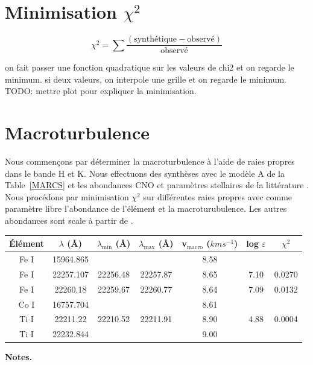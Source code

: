 \documentclass{article}
\begin{document}
\section{\sc Minimisation \texorpdfstring{$\chi^2$}{chi-squared}}

$$\chi^2 = \sum \frac{(\text{synth\'etique}-\text{observ\'e})}{\text{observ\'e}}$$

on fait passer une fonction quadratique sur les valeurs de chi2 et on regarde le minimum.
si deux valeurs, on interpole une grille et on regarde le minimum.
TODO: mettre plot pour expliquer la minimisation. 

\section{Macroturbulence}
Nous commençons par déterminer la macroturbulence à l'aide de raies propres dans le bande H et K. Nous effectuons des synthèses avec le modèle A de la Table~\ref{MARCS} et les abondances CNO et paramètres stellaires de la littérature \cite{shetye_s_2018}. Nous procédons par minimisation $\chi^2$ sur différentes raies propres avec comme paramètre libre l'abondance de l'élément et la macroturubulence. 
Les autres abondances sont scale à partir de \cite{grevesse_solar_2007}.

\begin{table}[h!]
\vspace{0.3cm}

\begin{center}
	\begin{tabular}{ccccccc}
        \hline
		\hline
        Élément & $\lambda$ (Å) & $\lambda_{\mathrm{min}}$ (Å) & $\lambda_{\mathrm{max}}$ (Å)& v$_{\mathrm{macro}}$ ($km s^{-1}$) & log $\varepsilon$ & $\chi^2$\\
        \hline
    Fe I & 15964.865 &&& 8.58 && \\
    Fe I & 22257.107 &22256.48&22257.87& 8.65 &7.10& 0.0270\\
    Fe I & 22260.18 &22259.67&22260.77& 8.64 & 7.09 & 0.0132\\
		Co I & 16757.704&& & 8.61 && \\
		Ti I & 22211.22 & 22210.52 & 22211.91 & 8.90 & 4.88 & 0.0004\\
		Ti I & 22232.844&& & 9.00 &&\\
    \end{tabular}
\end{center} 
\textbf{Notes.} 
\label{macro}
\end{table}
\end{document}
